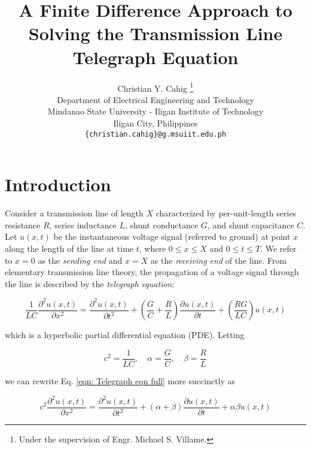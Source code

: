 \documentclass{article}
\title{A Finite Difference Approach to Solving the Transmission Line Telegraph Equation}
\author{Christian Y. Cahig
	\thanks{Under the supervision of Engr. Michael S. Villame.} \\
	Department of Electrical Engineering and Technology\\
	Mindanao State University - Iligan Institute of Technology\\
	Iligan City, Philippines \\
	\texttt{\{christian.cahig\}@g.msuiit.edu.ph} \\
}
\begin{document}
\maketitle

\begin{abstract}
\lipsum[4]
\end{abstract}

\section{Introduction}
\label{sec: Introduction}

Consider a transmission line of length $X$ characterized by per-unit-length
series resistance $R$,
series inductance $L$,
shunt conductance $G$,
and
shunt capacitance $C$.
Let $u \left(x,t\right)$ be the instantaneous voltage signal (referred to ground)
at point $x$ along the length of the line at time $t$,
where $0 \leq x \leq X$ and $0 \leq t \leq T$.
We refer to $x = 0$ as the \textit{sending end} and $x=X$ as the \textit{receiving end} of the line.
From elementary transmission line theory,
the propagation of a voltage signal through the line is described by the \textit{telegraph equation}:

\begin{equation}
   \label{eqn: Telegraph eqn full}
   \frac{1}{LC} \frac{\partial^{2} u \left(x,t\right)}{\partial x^{2}}
   =
   \frac{\partial^{2} u \left(x,t\right)}{\partial t^{2}}
   +
   \left(\frac{G}{C} + \frac{R}{L}\right) \frac{\partial u \left(x,t\right)}{\partial t}
   +
   \left(\frac{RG}{LC}\right) u \left(x,t\right)
\end{equation}

which is a hyperbolic partial differential equation (PDE).
Letting

\begin{equation*}
   c^{2} = \frac{1}{LC}, \quad \alpha = \frac{G}{C}, \quad \beta = \frac{R}{L}
\end{equation*}

we can rewrite Eq. \ref{eqn: Telegraph eqn full} more succinctly as

\begin{equation}
   \label{eqn: Telegraph eqn short}
   c^{2} \frac{\partial^{2} u \left(x,t\right)}{\partial x^{2}}
   =
   \frac{\partial^{2} u \left(x,t\right)}{\partial t^{2}}
   +
   \left(\alpha + \beta\right) \frac{\partial u \left(x,t\right)}{\partial t}
   +
   \alpha \beta u \left(x,t\right)
\end{equation}
\end{document}
